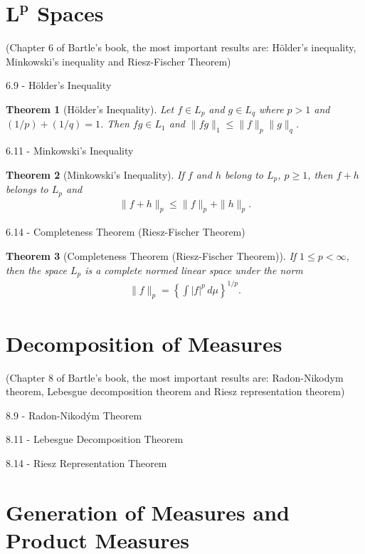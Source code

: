 \documentclass{article}
\newtheorem{theorem}{Theorem}[section]
\numberwithin{equation}{section}
\begin{document}
\newpage

\section{$\mathbf{L^p}$ Spaces}
(Chapter 6 of Bartle's book, the most important results are: Hölder's inequality, Minkowski's inequality and Riesz-Fischer Theorem)

6.9 - Hölder's Inequality

\begin{theorem}[Hölder's Inequality]
    Let $f\in L_p$ and $g \in L_q$ where $p>1$ and $(1/p) + (1/q) = 1$.
    Then $fg\in L_1$ and  $\| fg \|_1 \leq \|f\|_p \|g\|_q$.
\end{theorem}

6.11 - Minkowski's Inequality

\begin{theorem}[Minkowski's Inequality]
    If $f$ and $h$ belong to $L_p$, $p \geq 1$, then $f + h$ belongs to $L_p$ and
    \begin{align}\label{eq:b6.6}
        \| f + h \|_p \leq \| f \|_p + \| h \|_p.
    \end{align}
\end{theorem}

6.14 - Completeness Theorem (Riesz-Fischer Theorem)

\begin{theorem}[Completeness Theorem (Riesz-Fischer Theorem)]
    If $1\leq p < \infty$, then the space $L_p$ is a complete normed linear space under the norm
    \begin{align}\label{eq:b-under_th6.14}
        \| f \|_p = \left\{ \int |f|^p \, d\mu \right\}^{1/p}.
    \end{align}
\end{theorem}

\newpage

\section{Decomposition of Measures}
(Chapter 8 of Bartle's book, the most important results are: Radon-Nikodym theorem, Lebesgue decomposition theorem and Riesz representation theorem)

8.9 - Radon-Nikodým Theorem

8.11 - Lebesgue Decomposition Theorem

8.14 - Riesz Representation Theorem

\newpage

\section{Generation of Measures and Product Measures}
\end{document}
